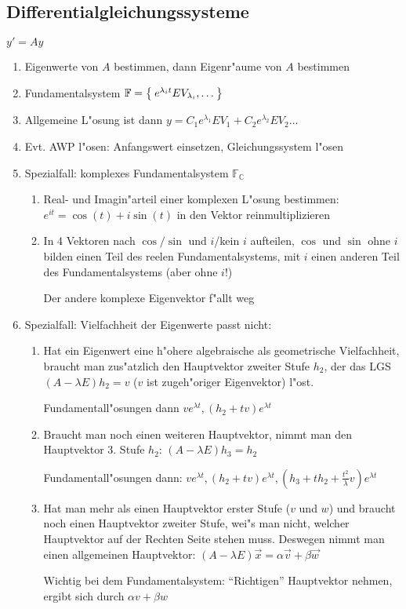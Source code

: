 \documentclass[fleqn,12pt]{scrartcl}
\begin{document}
\subsection{Differentialgleichungssysteme}
\label{sec:DGLS}
		$y' = Ay$
		\begin{enumerate}
			\item
				Eigenwerte von $A$ bestimmen, dann Eigenr"aume von $A$ bestimmen
			\item
				Fundamentalsystem $\mathbb{F} = \Set{e^{\lambda_i t} EV_{\lambda_i}, \dots}$
			\item
				Allgemeine L"osung ist dann $y = C_1 e^{\lambda_1} EV_1 + C_2 e^{\lambda_2} EV_2 \dots $
			\item
				Evt. AWP l"osen: Anfangswert einsetzen, Gleichungssystem l"osen
			\item
				Spezialfall: komplexes Fundamentalsystem $\mathbb{F_C}$
				\begin{enumerate}
					\item
						Real- und Imagin"arteil einer komplexen L"osung bestimmen: $e^{it} = \cos(t) + i\sin(t)$ in den Vektor reinmultiplizieren
					\item
						In 4 Vektoren nach $\cos/\sin$ und $i$/kein $i$ aufteilen, $\cos$ und $\sin$ ohne $i$ bilden einen Teil des reelen Fundamentalsystems, mit $i$ einen anderen Teil des Fundamentalsystems (aber ohne $i$!)

						Der andere komplexe Eigenvektor f"allt weg
				\end{enumerate}
			\item
				Spezialfall: Vielfachheit der Eigenwerte passt nicht:
				\begin{enumerate}
					\item
				Hat ein Eigenwert eine h"ohere algebraische als geometrische Vielfachheit, braucht man zus"atzlich den Hauptvektor zweiter Stufe $h_2$, der das LGS $(A-\lambda E)h_2 = v$ ($v$ ist zugeh"origer Eigenvektor) l"ost.

						Fundamentall"osungen dann $ve^{\lambda t}, (h_2+tv)e^{\lambda t}$
			\item
				Braucht man noch einen weiteren Hauptvektor, nimmt man den Hauptvektor 3. Stufe $h_2$: $(A-\lambda E)h_3 = h_2$

						Fundamentall"osungen dann: $ve^{\lambda t}, (h_2+tv)e^{\lambda t}, (h_3 + th_2 + \frac{t^2}{\lambda}v)e^{\lambda t}$
					\item
						Hat man mehr als einen Hauptvektor erster Stufe ($v$ und $w$) und braucht noch einen Hauptvektor zweiter Stufe, wei"s man nicht, welcher Hauptvektor auf der Rechten Seite stehen muss. Deswegen nimmt man einen allgemeinen Hauptvektor: $(A-\lambda E)\vec x = \alpha \vec v + \beta \vec w$

						Wichtig bei dem Fundamentalsystem: \enquote{Richtigen} Hauptvektor nehmen, ergibt sich durch $\alpha v + \beta w$
				\end{enumerate}
		\end{enumerate}
\end{document}
